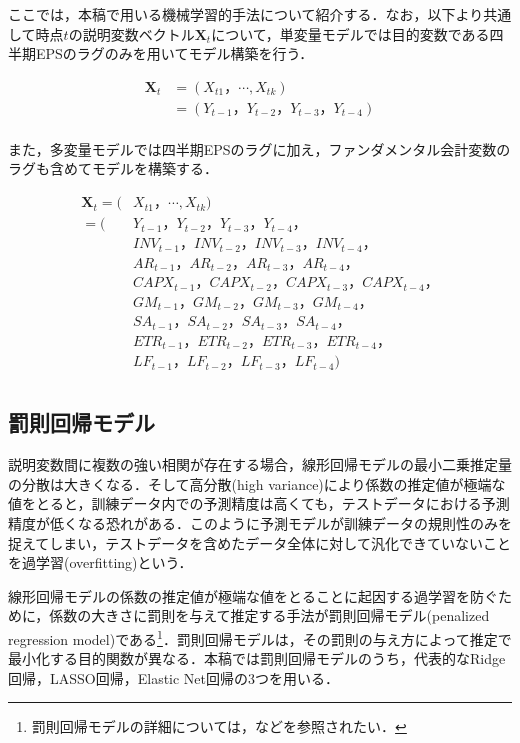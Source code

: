 \documentclass[a4paper，12pt]{jsarticle}
\begin{document}
ここでは，本稿で用いる機械学習的手法について紹介する．なお，以下より共通して時点$t$の説明変数ベクトル$\bm{X}_t$について，単変量モデルでは目的変数である四半期EPSのラグのみを用いてモデル構築を行う．

\begin{equation}
  \begin{split}
    \bm{X}_t &= (X_{t1}，\cdots ,X_{tk}) \\
    &= (Y_{t-1}，Y_{t-2}，Y_{t-3}，Y_{t-4}) \\
  \end{split}
\end{equation}

また，多変量モデルでは四半期EPSのラグに加え，ファンダメンタル会計変数のラグも含めてモデルを構築する．

\begin{equation}
  \begin{split}
    \bm{X}_t = (&X_{t1}，\cdots ,X_{tk}) \\ 
    =(&Y_{t-1}，Y_{t-2}，Y_{t-3}，Y_{t-4}，\\
    & INV_{t-1}，INV_{t-2}，INV_{t-3}，INV_{t-4}，\\
    & AR_{t-1}，AR_{t-2}，AR_{t-3}，AR_{t-4}，\\
    & CAPX_{t-1}，CAPX_{t-2}，CAPX_{t-3}，CAPX_{t-4}，\\
    & GM_{t-1}，GM_{t-2}，GM_{t-3}，GM_{t-4}，\\
    & SA_{t-1}，SA_{t-2}，SA_{t-3}，SA_{t-4}，\\
    & ETR_{t-1}，ETR_{t-2}，ETR_{t-3}，ETR_{t-4}，\\ 
    & LF_{t-1}，LF_{t-2}，LF_{t-3}，LF_{t-4}) \\
  \end{split}
\end{equation}

\subsection{罰則回帰モデル}

説明変数間に複数の強い相関が存在する場合，線形回帰モデルの最小二乗推定量の分散は大きくなる．そして高分散(high variance)により係数の推定値が極端な値をとると，訓練データ内での予測精度は高くても，テストデータにおける予測精度が低くなる恐れがある．このように予測モデルが訓練データの規則性のみを捉えてしまい，テストデータを含めたデータ全体に対して汎化できていないことを過学習(overfitting)という．

線形回帰モデルの係数の推定値が極端な値をとることに起因する過学習を防ぐために，係数の大きさに罰則を与えて推定する手法が罰則回帰モデル(penalized regression model)である\footnote{罰則回帰モデルの詳細については，\cite*{hoerl1970ridge, tibshirani1996regression, zou2005regularization}などを参照されたい．}．罰則回帰モデルは，その罰則の与え方によって推定で最小化する目的関数が異なる．本稿では罰則回帰モデルのうち，代表的なRidge回帰，LASSO回帰，Elastic Net回帰の3つを用いる．
\end{document}
